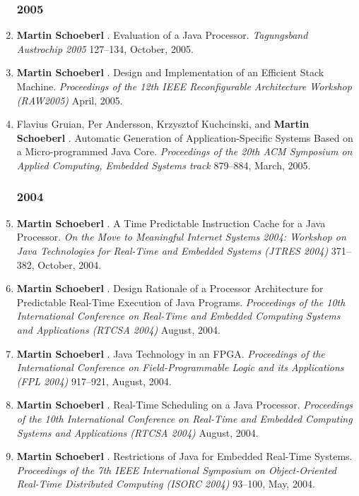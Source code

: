 \begin{enumerate}
\subsubsection*{2005}

\item {\bf Martin Schoeberl }.
 Evaluation of a Java Processor.
 \emph{Tagungsband Austrochip 2005} 127--134, October, 2005.

\item {\bf Martin Schoeberl }.
 Design and Implementation of an Efficient Stack Machine.
 \emph{Proceedings of the 12th IEEE Reconfigurable Architecture Workshop (RAW2005)} April, 2005.

\item Flavius Gruian, Per Andersson, Krzysztof Kuchcinski, and {\bf Martin Schoeberl }.
 Automatic Generation of Application-Specific Systems Based on a Micro-programmed Java Core.
 \emph{Proceedings of the 20th ACM Symposium on Applied Computing, Embedded Systems track} 879--884, March, 2005.


\subsubsection*{2004}

\item {\bf Martin Schoeberl }.
 A Time Predictable Instruction Cache for a Java Processor.
 \emph{On the Move to Meaningful Internet Systems 2004: Workshop on {J}ava Technologies for Real-Time and Embedded Systems (JTRES 2004)} 371--382, October, 2004.

\item {\bf Martin Schoeberl }.
 Design Rationale of a Processor Architecture for Predictable Real-Time Execution of Java Programs.
 \emph{Proceedings of the 10th International Conference on Real-Time and Embedded Computing Systems and Applications (RTCSA 2004)} August, 2004.

\item {\bf Martin Schoeberl }.
 Java Technology in an FPGA.
 \emph{Proceedings of the International Conference on Field-Programmable Logic and its Applications (FPL 2004)} 917--921, August, 2004.

\item {\bf Martin Schoeberl }.
 Real-Time Scheduling on a Java Processor.
 \emph{Proceedings of the 10th International Conference on Real-Time and Embedded Computing Systems and Applications (RTCSA 2004)} August, 2004.

\item {\bf Martin Schoeberl }.
 Restrictions of Java for Embedded Real-Time Systems.
 \emph{Proceedings of the 7th IEEE International Symposium on Object-Oriented Real-Time Distributed Computing (ISORC 2004)} 93--100, May, 2004.



\end{enumerate}
